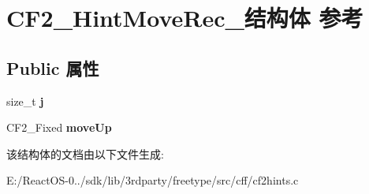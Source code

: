 \hypertarget{struct_c_f2___hint_move_rec__}{}\section{C\+F2\+\_\+\+Hint\+Move\+Rec\+\_\+结构体 参考}
\label{struct_c_f2___hint_move_rec__}
\subsection*{Public 属性}
\begin{DoxyCompactItemize}
\item 
\mbox{\label{struct_c_f2___hint_move_rec___a56e2c6dfe248ac0d46a9f7319eec2ed7}} 
size\+\_\+t {\bfseries j}
\item 
\mbox{\label{struct_c_f2___hint_move_rec___aa2f60f799c3176a0b578bfba33ab3a75}} 
C\+F2\+\_\+\+Fixed {\bfseries move\+Up}
\end{DoxyCompactItemize}


该结构体的文档由以下文件生成\+:\begin{DoxyCompactItemize}
\item 
E\+:/\+React\+O\+S-\/0../sdk/lib/3rdparty/freetype/src/cff/cf2hints.\+c\end{DoxyCompactItemize}
